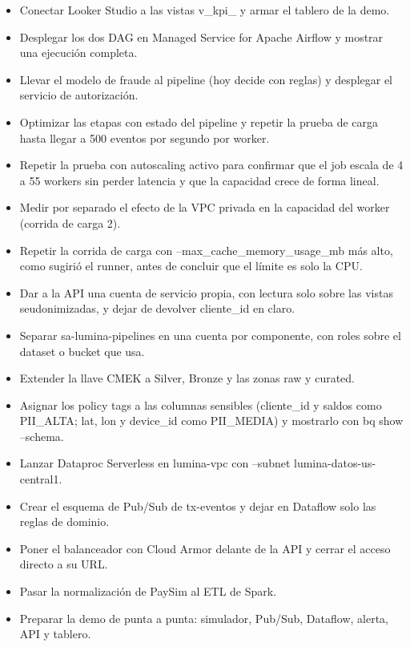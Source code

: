 \documentclass[11pt,a4paper]{article}
\DeclareRobustCommand{\cod}[1]{{\small\ttfamily\codbreaks #1}}
\DeclareRobustCommand{\codbreaks}{\let\oldus\_\renewcommand{\_}{\oldus\allowbreak}}
\begin{document}
\begin{itemize}
\item Conectar Looker Studio a las vistas \cod{v\_kpi\_*} y armar el tablero de la demo.
\item Desplegar los dos DAG en Managed Service for Apache Airflow y mostrar una ejecución completa.
\item Llevar el modelo de fraude al pipeline (hoy decide con reglas) y desplegar el servicio de autorización.
\item Optimizar las etapas con estado del pipeline y repetir la prueba de carga hasta llegar a 500 eventos por segundo por worker.
\item Repetir la prueba con autoscaling activo para confirmar que el job escala de 4 a 55 workers sin perder latencia y que la capacidad crece de forma lineal.
\item Medir por separado el efecto de la VPC privada en la capacidad del worker (corrida de carga 2).
\item Repetir la corrida de carga con \cod{--max\_cache\_memory\_usage\_mb} más alto, como sugirió el runner, antes de concluir que el límite es solo la CPU.
\item Dar a la API una cuenta de servicio propia, con lectura solo sobre las vistas seudonimizadas, y dejar de devolver \cod{cliente\_id} en claro.
\item Separar \cod{sa-lumina-pipelines} en una cuenta por componente, con roles sobre el dataset o bucket que usa.
\item Extender la llave CMEK a Silver, Bronze y las zonas raw y curated.
\item Asignar los policy tags a las columnas sensibles (\cod{cliente\_id} y saldos como \cod{PII\_ALTA}; \cod{lat}, \cod{lon} y \cod{device\_id} como \cod{PII\_MEDIA}) y mostrarlo con \cod{bq show --schema}.
\item Lanzar Dataproc Serverless en \cod{lumina-vpc} con \cod{--subnet lumina-datos-us-central1}.
\item Crear el esquema de Pub/Sub de \cod{tx-eventos} y dejar en Dataflow solo las reglas de dominio.
\item Poner el balanceador con Cloud Armor delante de la API y cerrar el acceso directo a su URL.
\item Pasar la normalización de PaySim al ETL de Spark.
\item Preparar la demo de punta a punta: simulador, Pub/Sub, Dataflow, alerta, API y tablero.
\end{itemize}
\end{document}
